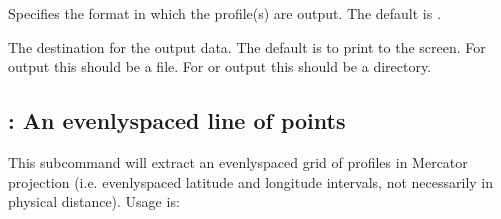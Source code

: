 \documentclass[letterpaper,10pt,english]{sphinxmanual}
\begin{document}
\sphinxAtStartPar
{}
\begin{description}
\sphinxAtStartPar
Specifies the format in which the profile(s) are output.  The default is .

\sphinxAtStartPar
The destination for the output data.  The default is to print to the screen.  For  output this should be a file.  For  or  output this should be a directory.

\sphinxAtStartPar
{}

\sphinxAtStartPar
{}

\end{description}


\subsection{: An evenly\sphinxhyphen{}spaced line of points}
\label{\detokenize{userguide:id1}}
\sphinxAtStartPar
This subcommand will extract an evenly\sphinxhyphen{}spaced grid of profiles in Mercator projection (i.e. evenly\sphinxhyphen{}spaced latitude and longitude intervals, not necessarily in physical distance).  Usage is:
\end{document}
